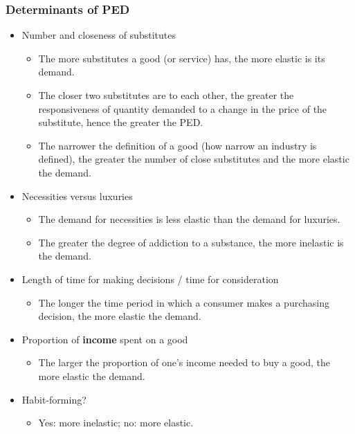 \subsubsection*{Determinants of PED}
\begin{itemize}
  \item Number and closeness of substitutes
  \begin{itemize}
    \item The more substitutes a good (or service) has, the more elastic is its demand.
    \item The closer two substitutes are to each other, the greater the responsiveness of quantity demanded to a change in the price of the substitute, hence the greater the PED.
    \item The narrower the definition of a good (how narrow an industry is defined), the greater the number of close substitutes and the more elastic the demand.
  \end{itemize}
  \item Necessities versus luxuries
  \begin{itemize}
    \item The demand for necessities is less elastic than the demand for luxuries.
    \item The greater the degree of addiction to a substance, the more inelastic is the demand. 
  \end{itemize}
  \item Length of time for making decisions / time for consideration
  \begin{itemize}
    \item The longer the time period in which a consumer makes a purchasing decision, the more elastic the demand.
  \end{itemize}
  \item Proportion of \textbf{income} spent on a good
  \begin{itemize}
    \item The larger the proportion of one's income needed to buy a good, the more elastic the demand.
  \end{itemize}
	\item Habit-forming?
	\begin{itemize}
	    \item Yes: more inelastic; no: more elastic.
	\end{itemize}
\end{itemize}
